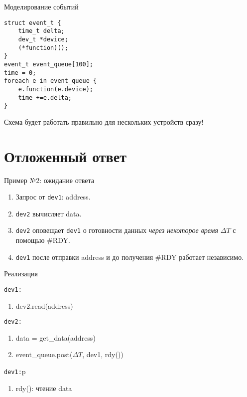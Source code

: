 \documentclass{beamer}
\begin{document}
\begin{frame}[fragile]{Моделирование событий}
\begin{verbatim}
struct event_t {
    time_t delta;
    dev_t *device;
    (*function)();
}
event_t event_queue[100];
time = 0;
foreach e in event_queue {
    e.function(e.device);
    time +=e.delta;
}
\end{verbatim}

Схема будет работать правильно для нескольких устройств сразу!

\end{frame}

\section{Отложенный ответ}

\begin{frame}{Пример №2: ожидание ответа}

\begin{center}
                 \end{center}

\begin{enumerate}
    \item Запрос от \texttt{dev1}: address.
    \item \texttt{dev2} вычисляет data.
    \item \texttt{dev2} оповещает \texttt{dev1} о готовности данных \textit{через некоторое время} $\Delta T$ с помощью \#RDY.
    \item \texttt{dev1} после отправки address и до получения \#RDY работает независимо.
\end{enumerate}

\end{frame}

\begin{frame}{Реализация}

\texttt{dev1:}
\begin{enumerate}
    \item dev2.read(address)
\end{enumerate}
\texttt{dev2:}
\begin{enumerate}
    \item data = get_data(address)
    \item event_queue.post($\Delta T$, dev1, rdy())
\end{enumerate}
\texttt{dev1:}p
\begin{enumerate}
    \item rdy(): чтение data
\end{enumerate}

\end{frame}
\end{document}
